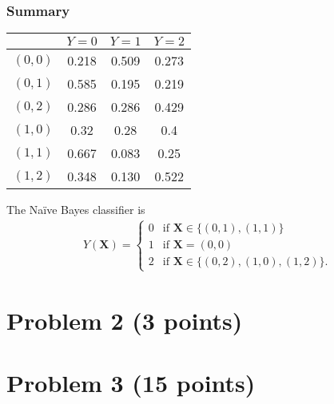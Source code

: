 \documentclass[10pt]{article}
\begin{document}
\subsubsection*{Summary}
\begin{tabular}{|l|c|c|c|}
  \hline
  & $Y = 0$ & $Y = 1$ & $Y = 2$ \\
  \hline
  $(0, 0)$ & 0.218 & 0.509 & 0.273 \\
  \hline
  $(0, 1)$ & 0.585 & 0.195 & 0.219 \\
  \hline
  $(0, 2)$ & 0.286 & 0.286 & 0.429 \\
  \hline
  $(1, 0)$ & 0.32 & 0.28 & 0.4 \\
  \hline
  $(1, 1)$ & 0.667 & 0.083 & 0.25 \\
  \hline
  $(1, 2)$ & 0.348 & 0.130 & 0.522 \\
  \hline
\end{tabular}

The Naïve Bayes classifier is
\begin{align*}
Y(\textbf{X}) = \begin{cases}
0 & \mbox{if } \textbf{X} \in \{ (0, 1), (1, 1) \} \\ 
1 & \mbox{if } \textbf{X} =  (0, 0) \\
2 & \mbox{if } \textbf{X} \in \{ (0, 2), (1, 0), (1, 2) \}.
\end{cases}
\end{align*}

\section*{Problem 2 (3 points)}

\section*{Problem 3 (15 points)}
\end{document}
